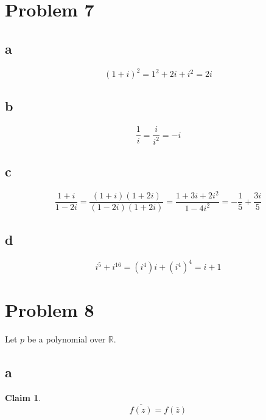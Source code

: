 \documentclass[12pt,letterpaper]{article}
\theoremstyle{definition}
\newtheorem*{claim}{Claim}
\newcommand{\R}{\mathbb{R}}
\begin{document}
\section*{Problem 7}

\subsection*{a}

\[
  (1 + i)^2 = 1^2 + 2i + i^2 = 2i
\]

\subsection*{b}

\[
  \frac{1}{i} = \frac{i}{i^2} = -i
\]

\subsection*{c}
\[
  \frac{1+i}{1-2i} = \frac{(1+i)(1+2i)}{(1-2i)(1+2i)} = \frac{1 + 3i + 2i^2}{1
    -4i^2} = -\frac{1}{5} + \frac{3i}{5}
\]
\subsection*{d}

\[
  i^5 + i^{16} = (i^4)i + (i^4)^4 = i + 1
\]

\section*{Problem 8}

Let $p$ be a polynomial over $\R$.

\subsection*{a}

\begin{claim}
  \[
    \overline{f(z)} = f(\overline{z})
  \]
\end{claim}
\end{document}
